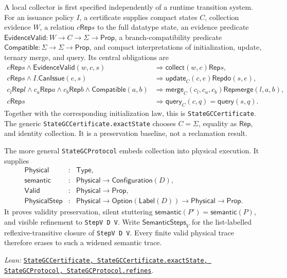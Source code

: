 \documentclass[11pt]{article}
\theoremstyle{definition}
\newcommand{\State}{\Sigma}
\newcommand{\doop}{\mathsf{do}}
\newcommand{\merge}{\mathsf{merge}}
\newcommand{\lean}[1]{\texttt{#1}}
\newcommand{\src}[2]{\href{../../#1}{\texttt{#2}}}
\newcommand{\anchor}[2]{\par\smallskip\noindent\emph{Lean: }\src{#1}{#2}.}
\begin{document}
A local collector is first specified independently of a runtime transition
system.  For an issuance policy $I$, a certificate supplies compact states
$C$, collection evidence $W$, a relation $c\mathrel{\mathsf{Rep}}s$ to the
full datatype state, an evidence predicate
$\mathsf{EvidenceValid}:W\to C\to\State\to\mathsf{Prop}$,
a branch-compatibility predicate
$\mathsf{Compatible}:\State\to\State\to\mathsf{Prop}$, and compact interpretations of
initialization, update, ternary merge, and query.  Its central obligations are
\[
\begin{aligned}
 c\mathrel{\mathsf{Rep}}s\land\mathsf{EvidenceValid}(w,c,s)
 &\Longrightarrow \mathsf{collect}(w,c)\mathrel{\mathsf{Rep}}s,\\
 c\mathrel{\mathsf{Rep}}s\land I.\mathsf{CanIssue}(e,s)
 &\Longrightarrow \mathsf{update}_C(c,e)
       \mathrel{\mathsf{Rep}}\doop(s,e),\\
 c_l\mathrel{\mathsf{Rep}}l\land c_a\mathrel{\mathsf{Rep}}a
 \land c_b\mathrel{\mathsf{Rep}}b\land\mathsf{Compatible}(a,b)
 &\Longrightarrow \mathsf{merge}_C(c_l,c_a,c_b)
       \mathrel{\mathsf{Rep}}\merge(l,a,b),\\
 c\mathrel{\mathsf{Rep}}s
 &\Longrightarrow \mathsf{query}_C(c,q)=\mathsf{query}(s,q).
\end{aligned}
\]
Together with the corresponding initialization law, this is
\lean{StateGCCertificate}.  The generic
\lean{StateGCCertificate.exactState} chooses $C=\State$, equality as
$\mathsf{Rep}$, and identity collection.  It is a preservation baseline, not
a reclamation result.

The more general \lean{StateGCProtocol} embeds collection into physical
execution.  It supplies
\[
\begin{array}{rcl}
 \mathsf{Physical}&:&\mathsf{Type},\\
 \mathsf{semantic}&:&\mathsf{Physical}\to\mathsf{Configuration}(D),\\
 \mathsf{Valid}&:&\mathsf{Physical}\to\mathsf{Prop},\\
 \mathsf{PhysicalStep}&:&\mathsf{Physical}\to
   \mathsf{Option}(\mathsf{Label}(D))\to\mathsf{Physical}\to\mathsf{Prop}.
\end{array}
\]
It proves validity preservation, silent stuttering
$\mathsf{semantic}(P')=\mathsf{semantic}(P)$, and visible refinement to
\lean{StepV D V}. Write $\mathsf{SemanticSteps}_V$ for the list-labelled
reflexive-transitive closure of \lean{StepV D V}. Every finite valid physical
trace therefore erases to such a widened semantic trace.
\anchor{Sal/MRDTs/Framework/StateGC.lean}
  {StateGCCertificate, StateGCCertificate.exactState,
   StateGCProtocol, StateGCProtocol.refines}
\end{document}
